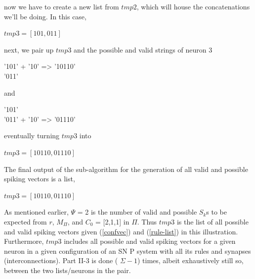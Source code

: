 \documentclass{acm_proc_article-sp}
\begin{document}
now we have to create a new list from $tmp2$, which will house the concatenations we'll be doing. In this case, 

		$tmp3 = [ 101, 011 ] $

next, we pair up $tmp3$ and the possible and valid strings of neuron 3 

'101' + '10' => '10110' \\
'011'
 
and 

'101' \\
'011' + '10' => '01110' 

eventually turning $tmp3$ into 

		$tmp3 = [ 10110, 01110 ]$ 

The final output of the sub-algorithm for the generation of all valid and possible spiking vectors is a list, 

		$tmp3 = [ 10110, 01110 ] $

As mentioned earlier, $\Psi$ = 2 is the number of valid and possible $S_k$s to be expected from $r$, $M_\Pi$, and $C_0$ = [2,1,1] in $\Pi$. Thus $tmp3$ is the list of all possible and valid spiking vectors given (\ref{confvec}) and (\ref{rule-list}) in this illustration. Furthermore, $tmp3$ includes all possible and valid spiking vectors for a given neuron in a given configuration of an SN P system with all its rules and 
synapses (interconnections). Part II-3 is done (	$\Sigma - 1$) times, albeit exhaustively still so, between the two lists/neurons in the pair. 
\end{document}

